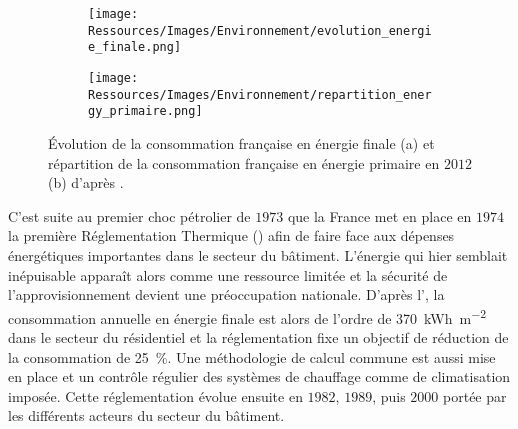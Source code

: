 \begin{figure}
    \centering
    \begin{subfigure}[b]{0.45\textwidth}
        \centering
        \texttt{[image: Ressources/Images/Environnement/evolution\_energie\_finale.png]}
        \caption{}
        \label{fig:evolution_energy_finale}
    \end{subfigure}
    \quad
    \begin{subfigure}[b]{0.45\textwidth}
        \centering
        \texttt{[image: Ressources/Images/Environnement/repartition\_energy\_primaire.png]}
        \caption{}
        \label{fig:repartition_conso_primaire}
    \end{subfigure}
    \caption[Description du secteur énergétique français]
             {Évolution de la consommation française en énergie finale (a) et
              répartition de la consommation française en énergie primaire en $2012$ (b)
              d’après \textcite{ADEME2015}.}
    \label{fig:energy_france}
\end{figure}

C’est suite au premier choc pétrolier de $1973$ que la France met en place en $1974$ la première
Réglementation Thermique () afin de faire face aux dépenses énergétiques importantes
dans le secteur du bâtiment. L’énergie qui hier semblait inépuisable apparaît
alors comme une ressource limitée et la sécurité de l’approvisionnement devient une
préoccupation nationale. D’après l’, la consommation annuelle en énergie finale est
alors de l’ordre de \SI{370}{kWh\per\metre\squared} dans le secteur du résidentiel et la
réglementation fixe un objectif de réduction de la consommation de
\SI{25}{\percent}. Une méthodologie de calcul commune est aussi mise en place et
un contrôle régulier des systèmes de chauffage comme de climatisation imposée.
Cette réglementation évolue ensuite en $1982$, $1989$, puis $2000$ portée par
les différents acteurs du secteur du bâtiment.

